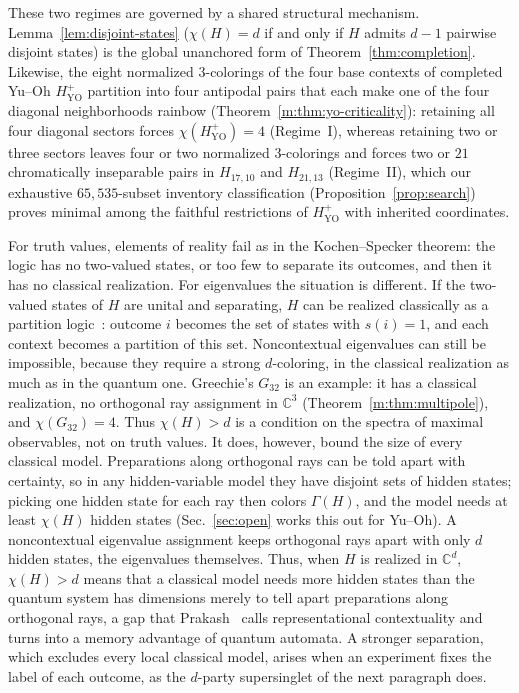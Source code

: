 \documentclass[aps,pra,reprint,superscriptaddress,longbibliography,nofootinbib,floatfix,10pt]{revtex4-2}
\theoremstyle{definition}\newtheorem{definition}[theorem]{Definition}
\theoremstyle{remark}\newtheorem{remark}[theorem]{Remark}
\newcommand{\C}{\mathbb C}\newcommand{\R}{\mathbb R}\newcommand{\Q}{\mathbb Q}
\newcommand{\YO}{\mathrm{YO}}\newcommand{\ip}[2]{\langle #1,#2\rangle}
\begin{document}
These two regimes are governed by a shared structural mechanism. Lemma~\ref{lem:disjoint-states} ($\chi(H)=d$ if and only if $H$ admits $d-1$ pairwise disjoint states) is the global unanchored form of Theorem~\ref{thm:completion}. Likewise, the eight normalized $3$-colorings of the four base contexts of completed Yu--Oh $H_{\YO}^+$ partition into four antipodal pairs that each make one of the four diagonal neighborhoods rainbow (Theorem~\ref{m:thm:yo-criticality}): retaining all four diagonal sectors forces $\chi(H_{\YO}^+)=4$ (Regime~I), whereas retaining two or three sectors leaves four or two normalized $3$-colorings and forces two or $21$ chromatically inseparable pairs in $H_{17,10}$ and $H_{21,13}$ (Regime~II), which our exhaustive $65{,}535$-subset inventory classification (Proposition~\ref{prop:search}) proves minimal among the faithful restrictions of $H_{\YO}^+$ with inherited coordinates.

For truth values, elements of reality fail as in the Kochen--Specker theorem: the logic has no two-valued states, or too few to separate its outcomes, and then it has no classical realization. For eigenvalues the situation is different. If the two-valued states of $H$ are unital and separating, $H$ can be realized classically as a partition logic~\cite{kochen1,dvur-pul-svo,svozil-2001-eua}: outcome $i$ becomes the set of states with $s(i)=1$, and each context becomes a partition of this set. Noncontextual eigenvalues can still be impossible, because they require a strong $d$-coloring, in the classical realization as much as in the quantum one. Greechie's $G_{32}$ is an example: it has a classical realization, no orthogonal ray assignment in $\C^3$ (Theorem~\ref{m:thm:multipole}), and $\chi(G_{32})=4$. Thus $\chi(H)>d$ is a condition on the spectra of maximal observables, not on truth values. It does, however, bound the size of every classical model. Preparations along orthogonal rays can be told apart with certainty, so in any hidden-variable model they have disjoint sets of hidden states; picking one hidden state for each ray then colors $\Gamma(H)$, and the model needs at least $\chi(H)$ hidden states (Sec.~\ref{sec:open} works this out for Yu--Oh). A noncontextual eigenvalue assignment keeps orthogonal rays apart with only $d$ hidden states, the eigenvalues themselves. Thus, when $H$ is realized in $\C^d$, $\chi(H)>d$ means that a classical model needs more hidden states than the quantum system has dimensions merely to tell apart preparations along orthogonal rays, a gap that Prakash~\cite{prakash2026memory} calls representational contextuality and turns into a memory advantage of quantum automata. A stronger separation, which excludes every local classical model, arises when an experiment fixes the label of each outcome, as the $d$-party supersinglet of the next paragraph does.
\end{document}
